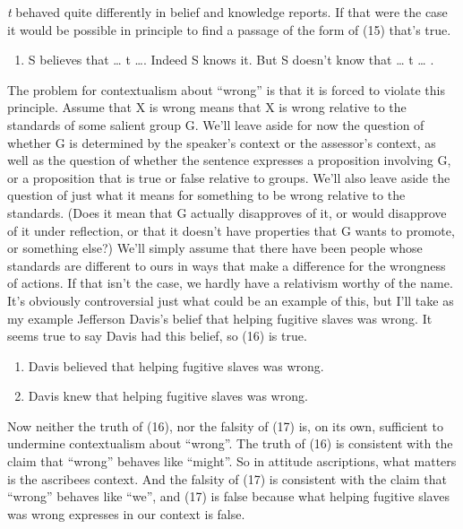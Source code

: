 \documentclass[
  11pt,
  letterpaper,
  DIV=11,
  numbers=noendperiod,
  twoside]{scrartcl}
\providecommand{\tightlist}{%
  \setlength{\itemsep}{0pt}\setlength{\parskip}{0pt}}
\begin{document}
\emph{t} behaved quite differently in belief and knowledge reports. If
that were the case it would be possible in principle to find a passage
of the form of (15) that's true.

\begin{enumerate}
\def\labelenumi{\arabic{enumi}.}
\setcounter{enumi}{14}
\tightlist
\item
  S believes that \ldots{} t \ldots. Indeed S knows it. But S doesn't
  know that \ldots{} t \ldots{} .
\end{enumerate}

The problem for contextualism about ``wrong'' is that it is forced to
violate this principle. Assume that X is wrong means that X is wrong
relative to the standards of some salient group G. We'll leave aside for
now the question of whether G is determined by the speaker's context or
the assessor's context, as well as the question of whether the sentence
expresses a proposition involving G, or a proposition that is true or
false relative to groups. We'll also leave aside the question of just
what it means for something to be wrong relative to the standards. (Does
it mean that G actually disapproves of it, or would disapprove of it
under reflection, or that it doesn't have properties that G wants to
promote, or something else?) We'll simply assume that there have been
people whose standards are different to ours in ways that make a
difference for the wrongness of actions. If that isn't the case, we
hardly have a relativism worthy of the name. It's obviously
controversial just what could be an example of this, but I'll take as my
example Jefferson Davis's belief that helping fugitive slaves was wrong.
It seems true to say Davis had this belief, so (16) is true.

\begin{enumerate}
\def\labelenumi{\arabic{enumi}.}
\setcounter{enumi}{15}
\tightlist
\item
  Davis believed that helping fugitive slaves was wrong.
\item
  Davis knew that helping fugitive slaves was wrong.
\end{enumerate}

Now neither the truth of (16), nor the falsity of (17) is, on its own,
sufficient to undermine contextualism about ``wrong''. The truth of (16)
is consistent with the claim that ``wrong'' behaves like ``might''. So
in attitude ascriptions, what matters is the ascribees context. And the
falsity of (17) is consistent with the claim that ``wrong'' behaves like
``we'', and (17) is false because what helping fugitive slaves was wrong
expresses in our context is false.
\end{document}
